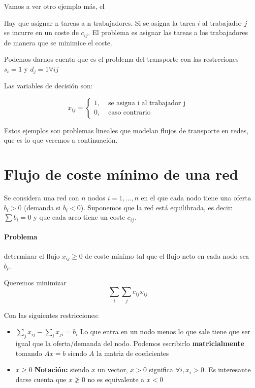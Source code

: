 Vamos a ver otro ejemplo más, el 
\begin{example}
Hay que asignar n tareas a n trabajadores. Si se asigna la tarea $i$ al
trabajador $j$ se incurre en un coste de $c_{ij}$.
El problema es asignar las tareas a los trabajadores de manera que se minimice el coste.

Podemos darnos cuenta que es el problema del transporte con las restrcciones $s_i = 1$ y $d_j = 1 ∀ij$

Las variables de decisión son:

\[x_{ij} = \left\{ \begin{array}{cc} 1, & \text{ se asigna i al trabajador j}\\0, & \text{ caso contrario}\end{array} \right. \]

\begin{ioprob}
\end{ioprob}

\end{example}


Estos ejemplos son problemas lineales que modelan flujos de transporte en redes, que es lo que veremos a continuación.

\section{Flujo de coste mínimo de una red}

Se considera una red con $n$ nodos $i=1,...,n$ en el que cada nodo tiene una oferta $b_i > 0$ (demanda si $b_i < 0$). 
Suponemos que la red está equilibrada, es decir: $\sum b_i = 0$ y que cada arco tiene un coste $c_{ij}$.

\paragraph{Problema} determinar el flujo $x_{ij}\geq 0$ de coste mínimo tal que el flujo neto en cada nodo sea $b_i$.

Queremos minimizar \[\sum_i \sum_j c_{ij}x_{ij}\]

Con las siguientes restricciones:

\begin{itemize}
	\item $\displaystyle \sum_j x_{ij} - \sum_i x_{ji} = b_i$ Lo que entra en un nodo menos lo que sale tiene que ser igual que la oferta/demanda del nodo. 
	Podemos escribirlo \textbf{matricialmente} tomando $Ax = b$ siendo $A$ la matriz de coeficientes
	\item $x \geq 0$
	\subitem \textbf{Notación: } siendo $x$ un vector, $x > 0$ significa $∀i, x_i>0$. Es interesante darse cuenta que $x \not\geq0 $ no es equivalente a $x<0$
\end{itemize}



